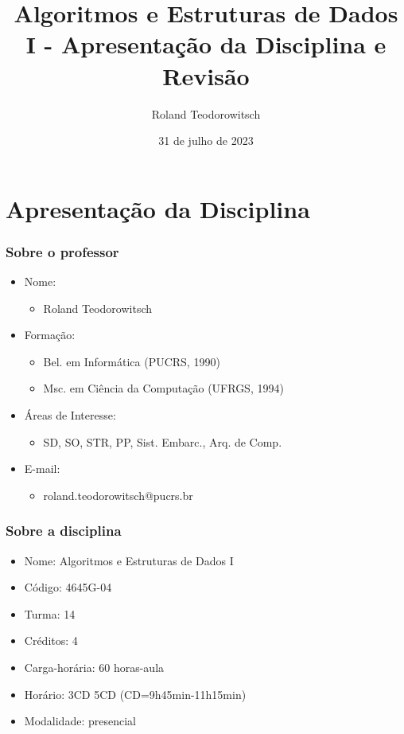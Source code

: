 \documentclass[aspectratio=169]{beamer}
\title[\sc{ALEST I - Apresentação da Disciplina e Revisão}]{Algoritmos e Estruturas de Dados I - Apresentação da Disciplina e Revisão}
\author[Roland Teodorowitsch]{Roland Teodorowitsch}
\institute[ALEST I - EP - PUCRS]{Algoritmos e Estruturas de Dados I - Escola Politécnica - PUCRS}
\date{31 de julho de 2023}
\begin{document}
\justifying

\begin{frame}
	\titlepage
\end{frame}

\section{Apresenta\c{c}\~ao da Disciplina}

\begin{frame}\frametitle{Sobre o professor}
\begin{itemize}
	\item Nome:
		\begin{itemize}
			\item Roland Teodorowitsch
		\end{itemize}
	\item Forma\c{c}\~ao:
		\begin{itemize}
			\item Bel. em Inform\'atica (PUCRS, 1990)
			\item Msc. em Ci\^encia da Computa\c{c}\~ao (UFRGS, 1994)
		\end{itemize}
	\item \'Areas de Interesse:
		\begin{itemize}
			\item SD, SO, STR, PP, Sist. Embarc., Arq. de Comp.
		\end{itemize}
	\item E-mail:
		\begin{itemize}
			\item roland.teodorowitsch@pucrs.br
		\end{itemize}
\end{itemize}
\end{frame}

\begin{frame}\frametitle{Sobre a disciplina}
\begin{itemize}
	\item Nome: Algoritmos e Estruturas de Dados I
	\item Código: 4645G-04
	\item Turma: 14
	\item Cr\'editos: 4
	\item Carga-horária: 60 horas-aula
	\item Hor\'ario: 3CD 5CD (CD=9h45min-11h15min)
	\item Modalidade: presencial
\end{itemize}
\end{frame}
\end{document}
